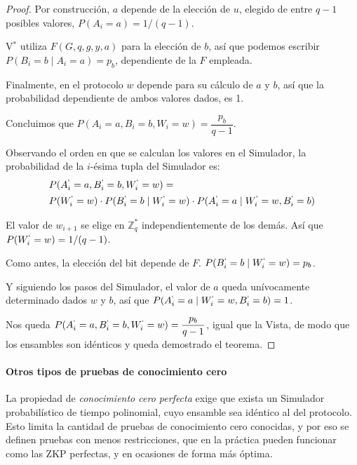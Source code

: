 \begin{proof}
	Por construcción, $a$ depende de la elección de $u$, elegido de entre $q-1$ posibles valores, $P(A_i = a) = 1/(q-1)$.
	
	V$^*$ utiliza $F(G,q,g,y,a)$ para la elección de $b$, así que podemos escribir $P(B_i = b \mid A_i = a) = p_b$, dependiente de la $F$ empleada.
	
	Finalmente, en el protocolo $w$ depende para su cálculo de $a$ y $b$, así que la probabilidad dependiente de ambos valores dados, es 1.
	
	Concluimos que $P(A_i=a, B_i=b, W_i = w) = \dfrac{p_b}{q-1}$.
	
	\hfil
	
	Observando el orden en que se calculan los valores en el Simulador, la probabilidad de la $i$-ésima tupla del Simulador es:
	\begin{align*}
	& P(A_i^`=a, B_i^`=b, W_i^` = w) = \\
	& P(W_i^` = w) \cdot P(B_i^` = b \mid W_i^` = w) \cdot P(A_i^` = a \mid W_i^` = w, B_i^`=b)
	\end{align*}
	
	El valor de $w_{i+1}$ se elige en $\mathbb{Z}_q^*$ independientemente de los demás. Así que $P(W_i^` = w) =  1/(q-1)$.
	
	Como antes, la elección del bit depende de $F$. $  P(B_i^` = b \mid W_i^` = w) = p_b $.
	
	Y siguiendo los pasos del Simulador, el valor de $a$ queda unívocamente determinado dados $w$ y $b$, así que $P(A_i^` = a \mid W_i^` = w, B_i^`=b) = 1$.
	
	Nos queda $ P(A_i^`=a, B_i^`=b, W_i^` = w) = \dfrac{p_b}{q-1}$, igual que la Vista, de modo que los ensambles son idénticos y queda demostrado el teorema.
	
\end{proof}


\hfil

\paragraph{Otros tipos de pruebas de conocimiento cero}

La propiedad de \textit{conocimiento cero perfecta} exige que exista un Simulador probabilístico de tiempo polinomial, cuyo ensamble sea idéntico al del protocolo. Esto limita la cantidad de pruebas de conocimiento cero conocidas, y por eso se definen pruebas con menos restricciones, que en la práctica pueden funcionar como las ZKP perfectas, y en ocasiones de forma más óptima.

